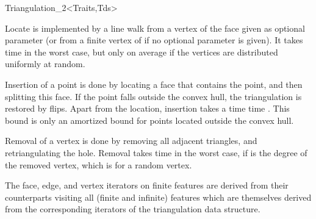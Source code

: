 \begin{ccRefClass}{Triangulation_2<Traits,Tds>}

Locate is implemented by a line walk from a vertex of the face given
as optional parameter (or from a finite vertex of
 if no optional parameter is given). It takes
time  in the worst case, but only 
on average if the vertices are distributed uniformly at random.

Insertion of a point is done by locating a face that contains the
point, and then splitting this face.
If the point falls outside the convex hull, the triangulation
 is restored by flips.  Apart from the location, insertion takes a time 
time . This bound is only an amortized bound
for points located outside the convex hull.

Removal of a vertex is done by removing all adjacent triangles, and
retriangulating the hole. Removal takes time  in the worst
case, if  is the degree of the removed vertex,
which is  for a random vertex.

The face, edge, and vertex iterators on finite features
are derived from their counterparts visiting all (finite and infinite)
features which are themselves derived from the corresponding iterators
of the triangulation data structure.



\ccSeeAlso
{} \\
 \\
 \\
 \\
 \\
 \\





\end{ccRefClass}
\ccModifierCrossRefOn


